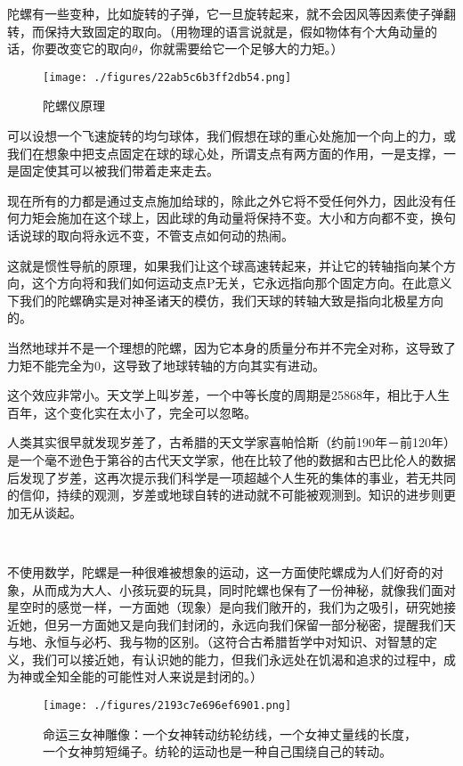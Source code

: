 陀螺有一些变种，比如旋转的子弹，它一旦旋转起来，就不会因风等因素使子弹翻转，而保持大致固定的取向。（用物理的语言说就是，假如物体有个大角动量的话，你要改变它的取向$\theta$，你就需要给它一个足够大的力矩。）

\begin{figure}[ht]
\centering
\texttt{[image: ./figures/22ab5c6b3ff2db54.png]}
\caption{陀螺仪原理} \label{fig_QMPre2_7}
\end{figure}


可以设想一个飞速旋转的均匀球体，我们假想在球的重心处施加一个向上的力，或我们在想象中把支点固定在球的球心处，所谓支点有两方面的作用，一是支撑，一是固定使其可以被我们带着走来走去。

现在所有的力都是通过支点施加给球的，除此之外它将不受任何外力，因此没有任何力矩会施加在这个球上，因此球的角动量将保持不变。大小和方向都不变，换句话说球的取向将永远不变，不管支点如何动的热闹。

这就是惯性导航的原理，如果我们让这个球高速转起来，并让它的转轴指向某个方向，这个方向将和我们如何运动支点P无关，它永远指向那个固定方向。在此意义下我们的陀螺确实是对神圣诸天的模仿，我们天球的转轴大致是指向北极星方向的。

当然地球并不是一个理想的陀螺，因为它本身的质量分布并不完全对称，这导致了力矩不能完全为0，这导致了地球转轴的方向其实有进动。

这个效应非常小。天文学上叫岁差，一个中等长度的周期是25868年，相比于人生百年，这个变化实在太小了，完全可以忽略。

人类其实很早就发现岁差了，古希腊的天文学家喜帕恰斯（约前190年－前120年）是一个毫不逊色于第谷的古代天文学家，他在比较了他的数据和古巴比伦人的数据后发现了岁差，这再次提示我们科学是一项超越个人生死的集体的事业，若无共同的信仰，持续的观测，岁差或地球自转的进动就不可能被观测到。知识的进步则更加无从谈起。

~

不使用数学，陀螺是一种很难被想象的运动，这一方面使陀螺成为人们好奇的对象，从而成为大人、小孩玩耍的玩具，同时陀螺也保有了一份神秘，就像我们面对星空时的感觉一样，一方面她（现象）是向我们敞开的，我们为之吸引，研究她接近她，但另一方面她又是向我们封闭的，永远向我们保留一部分秘密，提醒我们天与地、永恒与必朽、我与物的区别。（这符合古希腊哲学中对知识、对智慧的定义，我们可以接近她，有认识她的能力，但我们永远处在饥渴和追求的过程中，成为神或全知全能的可能性对人来说是封闭的。）

\begin{figure}[ht]
\centering
\texttt{[image: ./figures/2193c7e696ef6901.png]}
\caption{ 命运三⼥神雕像：⼀个⼥神转动纺轮纺线，⼀个⼥神丈量线的长度，⼀个⼥神剪短绳⼦。纺轮的运动也是⼀种自⼰围绕自⼰的转动。} \label{fig_QMPre2_8}
\end{figure}

